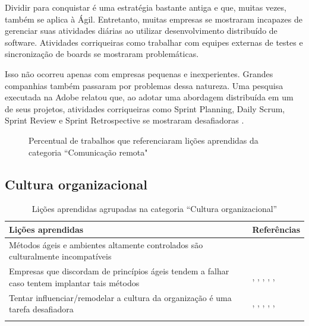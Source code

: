 Dividir para conquistar é uma estratégia bastante antiga e que, muitas vezes, também se aplica à Ágil. Entretanto, muitas empresas se mostraram incapazes de gerenciar suas atividades diárias ao utilizar desenvolvimento distribuído de software. Atividades corriqueiras como trabalhar com equipes externas de testes \cite{Bastos2013} e sincronização de boards \cite{Vieira2013} se mostraram problemáticas.

Isso não ocorreu apenas com empresas pequenas e inexperientes. Grandes companhias também passaram por problemas dessa natureza. Uma pesquisa executada na Adobe relatou que, ao adotar uma abordagem distribuída em um de seus projetos, atividades corriqueiras como Sprint Planning, Daily Scrum, Sprint Review e Sprint Retrospective se mostraram desafiadoras \cite{Adobe2012}.

\begin{figure}[H]
	\centering
	\captionsetup{justification=centering}
	\caption{Percentual de trabalhos que referenciaram lições aprendidas da categoria ``Comunicação remota"}
	\label{fig:comunicacao}
\end{figure}

\subsection{Cultura organizacional}

\begin{table}[H]
	\centering
	\captionsetup{justification=centering}
	\begin{tabularx}{\linewidth}{ | X | p{5cm} | } \hline \textbf{Lições aprendidas} & \textbf{Referências} \\ \hline
		Métodos ágeis e ambientes altamente controlados são culturalmente incompatíveis & \cite{Fitzgerald2013} \\ \hline
		Empresas que discordam de princípios ágeis tendem a falhar caso tentem implantar tais métodos & \cite{Bustard2013}, \cite{Microsoft2013}, \cite{Claudia2013}, \cite{Nokia2013}, \cite{Sahota2012}, \cite{Maciel2013} \\ \hline
		Tentar influenciar/remodelar a cultura da organização é uma tarefa desafiadora & \cite{Eunha2012}, \cite{Rodrigues2013}, \cite{Bastos2013}, \cite{Sahota2012}, \cite{Srinath2012}, \cite{Maciel2013} \\ \hline
	\caption{Lições aprendidas agrupadas na categoria ``Cultura organizacional''}
	\end{tabularx}
\end{table}


